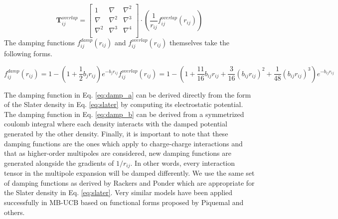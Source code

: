 \documentclass[journal=jctcce,manuscript=article]{achemso}
\begin{document}
\begin{equation}
  \bm{T}_{ij}^{overlap}=
  \begin{bmatrix}
    1 & \nabla & \nabla^2 \\
    \nabla & \nabla^2 & \nabla^3 \\
    \nabla^2 & \nabla^3 & \nabla^4 \\
  \end{bmatrix}\cdot
  \left(\frac{1}{r_{ij}}f_{ij}^{overlap}(r_{ij})\right)
  \label{eq:T_overlap}
\end{equation}
\noindent
The damping functions $f_{ij}^{damp}(r_{ij})$ and $f_{ij}^{overlap}(r_{ij})$ themselves take the following forms.

\begin{subequations}
  \begin{equation}
    f_{ij}^{damp}(r_{ij})=1-\left(1+\frac12b_{j}r_{ij}\right)e^{-b_{j}r_{ij}}
    \label{eq:damp_a}
  \end{equation}
  \begin{equation}
    f_{ij}^{overlap}(r_{ij})=1-\left(1+\frac{11}{16}b_{ij}r_{ij}+\frac{3}{16}(b_{ij}r_{ij})^2+\frac{1}{48}(b_{ij}r_{ij})^3\right)e^{-b_{ij}r_{ij}} 
    \label{eq:damp_b}
  \end{equation}
\end{subequations}
\noindent

The damping function in Eq. \ref{eq:damp_a} can be derived directly from the form
of the Slater density in Eq. \ref{eq:slater} by computing its electrostatic potential.
The damping function in Eq. \ref{eq:damp_b} can be derived from a symmetrized coulomb integral where each
density interacts with the damped potential generated by the other density.\cite{rackers2021polarizable}
Finally, it is important to note that these damping functions are the ones which apply
to charge-charge interactions and that as higher-order multipoles are considered, new damping
functions are generated alongside the gradients of $1/r_{ij}$. In other words, every interaction
tensor in the multipole expansion will be damped differently. We use the same set of damping functions
as derived by Rackers and Ponder which are appropriate for the Slater density in Eq. \ref{eq:slater}.\cite{rackers2021polarizable}
Very similar models have been applied successfully in MB-UCB\cite{das2019development}
based on functional forms proposed by Piquemal\cite{piquemal2003improved} and others\cite{wang2015general,rackers2017optimized}.
\end{document}
